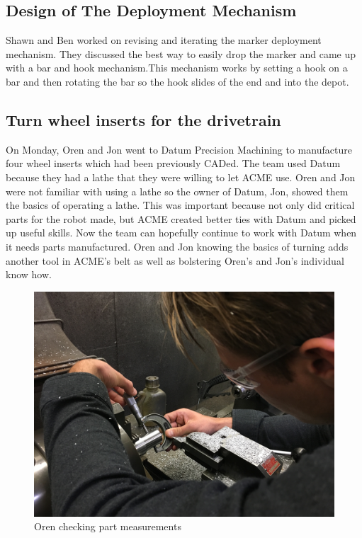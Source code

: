 \documentclass{article}
\newif\ifcontents
\begin{document}
\contentsfalse

\subsection{Design of The Deployment Mechanism}
Shawn and Ben worked on revising and iterating the marker deployment mechanism. They discussed the best way to easily drop the marker and came up with a bar and hook mechanism.This mechanism works by setting a hook on a bar and then rotating the bar so the hook slides of the end and into the depot.

\subsection{Turn wheel inserts for the drivetrain}
On Monday, Oren and Jon went to Datum Precision Machining to manufacture four wheel inserts which had been previously CADed. The team used Datum because they had a lathe that they were willing to let ACME use. Oren and Jon were not familiar with using a lathe so the owner of Datum, Jon, showed them the basics of operating a lathe. This was important because not only did critical parts for the robot made, but ACME created better ties with Datum and picked up useful skills. Now the team can hopefully continue to work with Datum when it needs parts manufactured. Oren and Jon knowing the basics of turning adds another tool in ACME’s belt as well as bolstering Oren’s and Jon’s individual know how.

\begin{figure}
    \centering
    \includegraphics[width=.6 \textwidth]{08_10-22/images/IMG_0330.JPG}
    \caption{Oren checking part measurements}
    \label{fig: Turning Inserts}
\end{figure}
\end{document}
